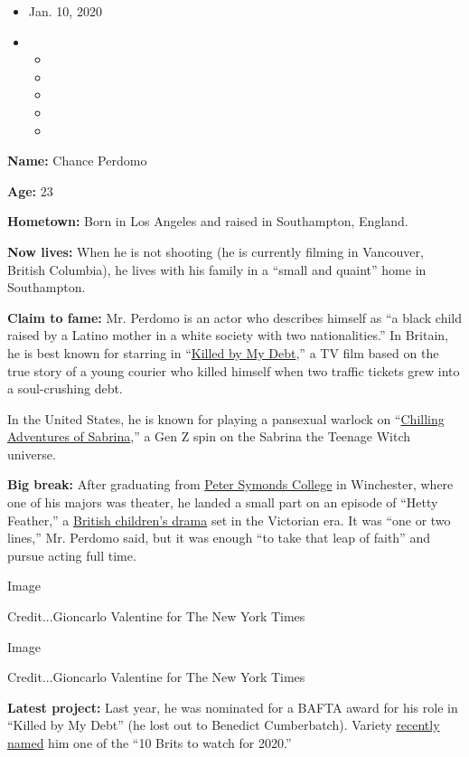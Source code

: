 \begin{itemize}
\item
  Jan. 10, 2020
\item
  \begin{itemize}
  \item
  \item
  \item
  \item
  \item
  \end{itemize}
\end{itemize}

\textbf{Name:} Chance Perdomo

\textbf{Age:} 23

\textbf{Hometown:} Born in Los Angeles and raised in Southampton,
England.

\textbf{Now lives:} When he is not shooting (he is currently filming in
Vancouver, British Columbia), he lives with his family in a ``small and
quaint'' home in Southampton.

\textbf{Claim to fame:} Mr. Perdomo is an actor who describes himself as
``a black child raised by a Latino mother in a white society with two
nationalities.'' In Britain, he is best known for starring in
``\href{https://www.youtube.com/watch?v=mIeVilRBAUw}{Killed by My
Debt},'' a TV film based on the true story of a young courier who killed
himself when two traffic tickets grew into a soul-crushing debt.

In the United States, he is known for playing a pansexual warlock on
``\href{https://www.nytimes.com/2018/10/26/arts/television/the-chilling-adventures-of-sabrina-review-netflix.html}{Chilling
Adventures of Sabrina},'' a Gen Z spin on the Sabrina the Teenage Witch
universe.

\textbf{Big break:} After graduating from
\href{https://www.psc.ac.uk}{Peter Symonds College} in Winchester, where
one of his majors was theater, he landed a small part on an episode of
``Hetty Feather,'' a \href{https://www.byutv.org/hettyfeather}{British
children's drama} set in the Victorian era. It was ``one or two lines,''
Mr. Perdomo said, but it was enough ``to take that leap of faith'' and
pursue acting full time.

Image

Credit...Gioncarlo Valentine for The New York Times

Image

Credit...Gioncarlo Valentine for The New York Times

\textbf{Latest project:} Last year, he was nominated for a BAFTA award
for his role in ``Killed by My Debt'' (he lost out to Benedict
Cumberbatch). Variety
\href{https://variety.com/2019/film/news/variety-10-brits-to-watch-2020-1203440068/}{recently
named} him one of the ``10 Brits to watch for 2020.''

